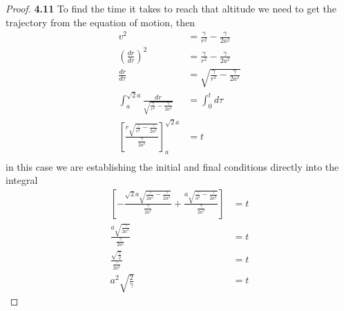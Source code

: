 \documentclass[11pt]{article}
\theoremstyle{definition}
\begin{document}
\begin{proof}{\textbf{4.11}}
        To find the time it takes to reach that altitude we need to get the
        trajectory from the equation of motion, then
        \begin{align*}
            v^2 &= \frac{\gamma}{r^2} - \frac{\gamma}{2a^2}\\
            \left(\frac{dr}{d\tau}\right)^2 &= \frac{\gamma}{r^2}- \frac{\gamma}{2a^2}\\
            \frac{dr}{d\tau} &= \sqrt{\frac{\gamma}{r^2}- \frac{\gamma}{2a^2}}\\
            \int_a^{\sqrt{2}a} \frac{dr}{\sqrt{\frac{\gamma}{r^2}- \frac{\gamma}{2a^2}}}
                &= \int_0^t d\tau\\
            \left[
                \frac{r\sqrt{\frac{\gamma}{r^2}-\frac{\gamma}{2a^2}}}{\frac{\gamma}{2a^2}}
            \right]_a^{\sqrt{2}a}
                &=  t\\
        \end{align*}
        in this case we are establishing the initial and final conditions
        directly into the integral 
        \begin{align*} 
            \left[
                - \frac{\sqrt{2}a\sqrt{\frac{\gamma}{2a^2}-\frac{\gamma}{2a^2}}}{\frac{\gamma}{2a^2}}
                + \frac{a\sqrt{\frac{\gamma}{a^2}-\frac{\gamma}{2a^2}}}{\frac{\gamma}{2a^2}}  
            \right]
                &=  t\\
            \frac{a\sqrt{\frac{\gamma}{2a^2}}}{\frac{\gamma}{2a^2}} &=  t\\
            \frac{\sqrt{\frac{\gamma}{2}}}{\frac{\gamma}{2a^2}} &=  t\\    
            a^2\sqrt{\frac{2}{\gamma}} &=  t
            \end{align*}
    \end{proof}
\end{document}
